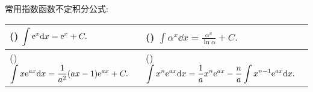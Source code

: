 常用指数函数不定积分公式:
\setcounter{magicrownumbers}{0}
\begin{table}[H]
    \centering
    \begin{tabular}{l l}
        (\rownumber{}) $\displaystyle\int \mathrm{e} ^{x} \dd  x=\mathrm{e} ^{x}+C.$                              & (\rownumber{}) $\displaystyle\int \alpha^{x} \dd  x=\frac{\alpha^{x}}{\ln \alpha}+C.$                                            \\
        \midrule
        (\rownumber{}) $\displaystyle\int x \mathrm{e} ^{a x} \dd  x=\frac{1}{a^{2}}(a x-1) \mathrm{e} ^{a x}+C.$ & (\rownumber{}) $\displaystyle\int x^{n} \mathrm{e} ^{a x} \dd  x=\frac{1}{a} x^{n} \mathrm{e} ^{a x}-\frac{n}{a} \int x^{n-1} \mathrm{e} ^{a x} \dd  x.$ \\
    \end{tabular}
\end{table}

